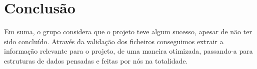 \documentclass[a4paper]{report} %
\begin{document}
\chapter{Conclusão}
Em suma, o grupo considera que o projeto teve algum sucesso, apesar de não ter sido concluído. Através da validação dos ficheiros conseguimos extrair a informação relevante para o projeto, de uma maneira otimizada, passando-a para estruturas de dados pensadas e feitas por nós na totalidade. 




   
\end{document}
